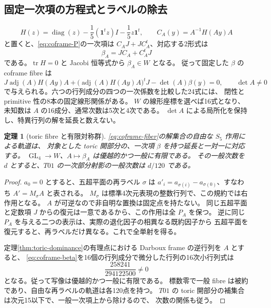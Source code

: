\documentclass[11pt,a4paper]{ltjsarticle}
\DeclareMathOperator{\GL}{GL}
\newtheorem{theorem}{定理}[section]
\theoremstyle{remark}
\begin{document}
\subsection{固定一次項の方程式とラベルの除去}
\[
 H(z)=\operatorname{diag}(z)-\frac15(\mathbf1^tz)I
                         -\frac15z\mathbf1^t,\qquad C_A(y)=A^{-1}H(Ay)A
\]
と置くと、\eqref{eq:coframe-P}の一次項は $C_AJ+JC_A^t$、対応する2形式は
\begin{equation}\label{eq:coframe-beta}
 \beta_A=JC_A+C_A^tJ
\end{equation}
である。$\operatorname{tr}H=0$ と Jacobi 恒等式から $\beta_A\in W$ となる。
従って固定した $\beta$ の coframe fibre は
\begin{equation}\label{eq:coframe-fiber}
 J\operatorname{adj}(A)H(Ay)A+
   \bigl(\operatorname{adj}(A)H(Ay)A\bigr)^tJ
       -\det(A)\beta(y)=0,\qquad \det A\ne0
\end{equation}
で与えられる。六つの行列成分の四つの一次係数を比較した24式には、
閉性と primitive 性の8本の固定線形関係がある。
$W$ の線形座標を選べば16式となり、未知数は $A$ の16成分、通常次数は5次と4次である。
$\det A$ による局所化を保持し、特異行列の解を延長と数えない。

\begin{theorem}[toric fibre と有限対称群]\label{thm:coframe-fiber}
\eqref{eq:coframe-fiber}の解集合の自由な $S_5$ 作用による軌道は、
対象とした toric 開部分の、一次項 $\beta$ を持つ延長と一対一に対応する。
$\GL_4\to W$、$A\mapsto\beta_A$ は優越的かつ一般に有限である。
その一般次数を $d$ とすると、$T01$ の一次部分射影の一般次数は $d/120$ である。
\end{theorem}
\begin{proof}
$a_0=0$ とすると、五超平面の再ラベル $\sigma$ は
$a'_i=a_{\sigma(i)}-a_{\sigma(0)}$、すなわち $A'=M_\sigma A$ と表される。
$M_\sigma$ は標準4次元表現の整数行列で、この規約では右作用となる。
$A$ が可逆なので非自明な置換は固定点を持たない。
同じ五超平面と定数項 $J$ からの復元は一意であるから、この作用は全 $P_A$ を保つ。
逆に同じ $P_A$ を与える二つの表示は、実際の退化因子の相異なる既約因子から
五超平面を復元すると、再ラベルだけ異なる。これで全単射を得る。

定理\ref{thm:toric-dominance}の有理点における Darboux frame の逆行列を $A$ とすると、
\eqref{eq:coframe-beta}を16個の行列成分で微分した行列の16次小行列式は
\[
 \frac{258241}{294122500}\ne0
\]
となる\cite{coframe-certificate}。従って写像は優越的かつ一般に有限である。
標数零で一般 fibre は被約であり、自由な再ラベルの軌道は各120点を持つ。
$T01$ の toric 開部分の補集合は次元15以下で、一般一次項上から除けるので、
次数の関係も従う。
\end{proof}
\end{document}
